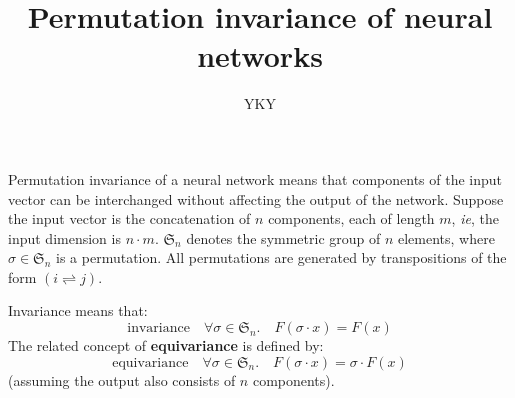 

\usepackage{xeCJK}
\usepackage{color}
\usepackage{hyperref}

\usepackage{mathtools}
\usepackage{hyperref}

\title{Permutation invariance of neural networks}
\author{YKY}


\maketitle

Permutation invariance of a neural network means that components of the input vector can be interchanged without affecting the output of the network.  Suppose the input vector is the concatenation of $n$ components, each of length $m$, \textit{ie}, the input dimension is $n \cdot m$.  $\mathfrak{S}_n$ denotes the symmetric group of $n$ elements, where $\sigma \in \mathfrak{S}_n$ is a permutation.  All permutations are generated by transpositions of the form $(i \rightleftharpoons j)$.

Invariance means that:
\begin{equation}
\label{eqn:invariance}
\boxed{\mbox{invariance}} \quad \forall \sigma \in \mathfrak{S}_n. \quad F(\sigma \cdot x) = F(x)
\end{equation}
The related concept of \textbf{equivariance} is defined by:
\begin{equation}
\label{eqn:invariance}
\boxed{\mbox{equivariance}} \quad \forall \sigma \in \mathfrak{S}_n. \quad F(\sigma \cdot x) = \sigma \cdot F(x)
\end{equation}
(assuming the output also consists of $n$ components).

